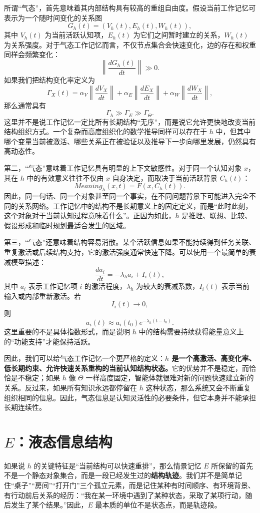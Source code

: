 所谓“气态”，首先意味着其内部结构具有较高的重组自由度。假设当前工作记忆可表示为一个随时间变化的关系图
\[
G_h(t)=\left(V_h(t),E_h(t),W_h(t)\right),
\]
其中 $V_h(t)$ 为当前活跃认知项，$E_h(t)$ 为它们之间暂时建立的关系，$W_h(t)$ 为关系强度。对于气态工作记忆而言，不仅节点集合会快速变化，边的存在和权重同样会频繁变化：
\[
\left\|
\frac{dG_h(t)}{dt}
\right\|
\gg 0.
\]
如果我们把结构变化率定义为
\[
\Gamma_X(t)
=
\alpha_V
\left\|
\frac{dV_X}{dt}
\right\|
+
\alpha_E
\left\|
\frac{dE_X}{dt}
\right\|
+
\alpha_W
\left\|
\frac{dW_X}{dt}
\right\|,
\]
那么通常具有
\[
\Gamma_h
\gg
\Gamma_E
\gg
\Gamma_\Theta.
\]
这里并不是说工作记忆一定比所有长期结构“无序”，而是说它允许更快地改变当前结构组织方式。一个复杂而高度组织化的数学推导同样可以存在于 $h$ 中，但其中哪个变量当前被激活、哪些关系正在被验证以及推导下一步向哪里发展，仍然具有高动态性。

第二，“气态”意味着工作记忆具有明显的上下文敏感性。对于同一个认知对象 $x$，其在 $h$ 中的有效意义往往不仅由 $x$ 自身决定，而取决于当前活跃背景 $C_h(t)$：
\[
Meaning_h(x,t)
=
F\left(
x,C_h(t)
\right).
\]
因此，同一句话、同一个对象甚至同一个事实，在不同问题背景下可能进入完全不同的关系网络。工作记忆中的结构不是长期意义上的固定定义，而是“此时此刻，这个对象对于当前认知过程意味着什么”。正因为如此，$h$ 是推理、联想、比较、假设形成和临时规划最适合发生的区域。

第三，“气态”还意味着结构容易消散。某个活跃信息如果不能持续得到任务关联、重复激活或后续结构支持，它的激活强度通常快速下降。可以使用一个最简单的衰减模型描述：
\[
\frac{da_i}{dt}
=
-\lambda_h a_i
+
I_i(t),
\]
其中 $a_i$ 表示工作记忆项 $i$ 的激活程度，$\lambda_h$ 为较大的衰减系数，$I_i(t)$ 表示当前输入或内部重新激活。若
\[
I_i(t)\rightarrow 0,
\]
则
\[
a_i(t)
\approx
a_i(t_0)
e^{-\lambda_h(t-t_0)}.
\]
这里重要的不是具体指数形式，而是说明 $h$ 中的结构需要持续获得能量意义上的“功能支持”才能保持活跃。

因此，我们可以给气态工作记忆一个更严格的定义：\textbf{$h$ 是一个高激活、高变化率、低长期约束、允许快速关系重构的当前认知结构状态。}它的优势并不是稳定，而恰恰是不稳定；如果 $h$ 像 $\Theta$ 一样高度固定，智能体就很难对新的问题快速建立新的关系。反过来，如果所有知识永远都停留在 $h$ 这种状态，那么系统又会不断重复组织相同的信息。因此，气态信息是认知灵活性的必要条件，但它本身并不能承担长期连续性。


\section{$E$：液态信息结构}

如果说 $h$ 的关键特征是“当前结构可以快速重排”，那么情景记忆 $E$ 所保留的首先不是一个静态对象集合，而是一段已经发生过的\textbf{结构轨迹}。我们并不是简单记住“桌子”“房间”“打开门”三个孤立元素，而是记住某种有时间顺序、有环境背景、有行动前后关系的经历：“我在某一环境中遇到了某种状态，采取了某项行动，随后发生了某个结果。”因此，$E$ 最本质的单位不是状态点，而是轨迹段。

